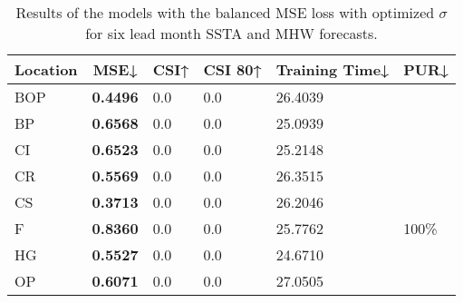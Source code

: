 \documentclass[11pt, a4paper]{article}
\begin{document}
\begin{table}[H]
\centering
\small
\caption{Results of the models with the balanced MSE loss with optimized $\sigma$ for six lead month SSTA and MHW forecasts.}
\begin{tabular}{llllll}
\multicolumn{1}{c}{\textbf{Location}} & \multicolumn{1}{c}{\textbf{MSE↓}} & \multicolumn{1}{c}{\textbf{CSI↑}} & \multicolumn{1}{c}{\textbf{CSI 80↑}} & \multicolumn{1}{c}{\textbf{Training Time↓}} & \multicolumn{1}{c}{\textbf{PUR↓}} \\ \hline
BOP                         & \textbf{0.4496}                   & 0.0                               & 0.0                                  & 26.4039                                     &                                   \\
BP                        & \textbf{0.6568}                   & 0.0                               & 0.0                                  & 25.0939                                     &                                   \\
CI                        & \textbf{0.6523}                   & 0.0                               & 0.0                                  & 25.2148                                     &                                   \\
CR                           & \textbf{0.5569}                   & 0.0                               & 0.0                                  & 26.3515                                     &                                   \\
CS                           & \textbf{0.3713}                   & 0.0                               & 0.0                                  & 26.2046                                     &                                   \\
F                             & \textbf{0.8360}                   & 0.0                               & 0.0                                  & 25.7762                                     & 100\%                             \\
HG                          & \textbf{0.5527}                   & 0.0                               & 0.0                                  & 24.6710                                     &                                   \\
OP                       & \textbf{0.6071}                   & 0.0                               & 0.0                                  & 27.0505                                     &                                   \\

\end{tabular}
\end{table}
\end{document}
